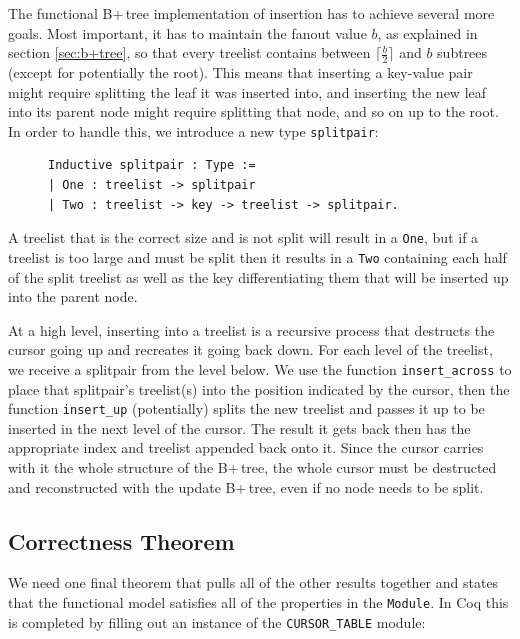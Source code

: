 \documentclass[a4paper,12pt]{article}
\begin{document}
The functional B+\,tree implementation of insertion has to achieve several more goals. Most important, it has to maintain the fanout value $b$, as explained in section \ref{sec:b+tree}, so that every treelist contains between $\lceil \frac{b}{2} \rceil$ and $b$ subtrees (except for potentially the root). This means that inserting a key-value pair might require splitting the leaf it was inserted into, and inserting the new leaf into its parent node might require splitting that node, and so on up to the root. In order to handle this, we introduce a new type \texttt{splitpair}:

\begin{figure}[h]
\begin{singlespace}
\begin{verbatim}
Inductive splitpair : Type :=
| One : treelist -> splitpair
| Two : treelist -> key -> treelist -> splitpair.
\end{verbatim}
\end{singlespace}
\end{figure}

A treelist that is the correct size and is not split will result in a \texttt{One}, but if a treelist is too large and must be split then it results in a \texttt{Two} containing each half of the split treelist as well as the key differentiating them that will be inserted up into the parent node.

At a high level, inserting into a treelist is a recursive process that destructs the cursor going up and recreates it going back down. For each level of the treelist, we receive a splitpair from the level below. We use the function \texttt{insert\_across} to place that splitpair’s treelist(s) into the position indicated by the cursor, then the function \texttt{insert\_up} (potentially) splits the new treelist and passes it up to be inserted in the next level of the cursor. The result it gets back then has the appropriate index and treelist appended back onto it. Since the cursor carries with it the whole structure of the B+\,tree, the whole cursor must be destructed and reconstructed with the update B+\,tree, even if no node needs to be split.

\subsection{Correctness Theorem}

We need one final theorem that pulls all of the other results together and states that the functional model satisfies all of the properties in the \texttt{Module}. In Coq this is completed by filling out an instance of the \texttt{CURSOR\_TABLE} module:
\end{document}

